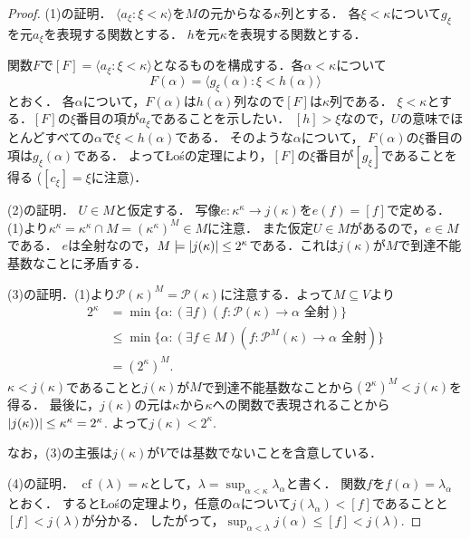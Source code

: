 \documentclass[uplatex]{jsarticle}
\newcommand{\Pow}{\mathcal{P}}
\newcommand{\cf}{\operatorname{cf}}
\newcommand{\seq}[1]{{\langle#1\rangle}}
\DeclarePairedDelimiter\abs{\lvert}{\rvert}
\renewcommand\subset{\subseteq}
\theoremstyle{definition}
\begin{document}
	\begin{proof}
		(1)の証明．
		$\seq{a_\xi : \xi < \kappa}$を$M$の元からなる$\kappa$列とする．
		各$\xi < \kappa$について$g_\xi$を元$a_\xi$を表現する関数とする．
		$h$を元$\kappa$を表現する関数とする．
		
		関数$F$で$[F] = \seq{a_\xi : \xi < \kappa}$となるものを構成する．各$\alpha < \kappa$について
		\[
		F(\alpha) = \seq{g_\xi(\alpha) : \xi < h(\alpha)}
		\]
		とおく．
		各$\alpha$について，$F(\alpha)$は$h(\alpha)$列なので$[F]$は$\kappa$列である．
		$\xi < \kappa$とする．$[F]$の$\xi$番目の項が$a_\xi$であることを示したい．
		$[h] > \xi$なので，$U$の意味でほとんどすべての$\alpha$で$\xi < h(\alpha)$である．
		そのような$\alpha$について， $F(\alpha)$の$\xi$番目の項は$g_\xi(\alpha)$である．
		よってŁośの定理により，$[F]$の$\xi$番目が$[g_\xi]$であることを得る ($[c_\xi] = \xi$に注意)．
		
		(2)の証明．
		$U \in M$と仮定する．
		写像$e \colon \kappa^\kappa \to j(\kappa)$を$e(f) = [f]$で定める．
		(1)より$\kappa^\kappa = \kappa^\kappa \cap M = (\kappa^\kappa)^M \in M$に注意．
		また仮定$U \in M$があるので，$e \in M$である．
		$e$は全射なので，$M \models \abs{j(\kappa)} \le 2^\kappa$である．これは$j(\kappa)$が$M$で到達不能基数なことに矛盾する．
		
		(3)の証明．(1)より$\Pow(\kappa)^M = \Pow(\kappa)$に注意する．よって$M \subset V$より
		\begin{align*}
		2^\kappa &= \min \{ \alpha : (\exists f)(f \colon \Pow(\kappa) \to \alpha \text{ 全射}) \} \\
		&\le \min \{ \alpha : (\exists f \in M)(f \colon \Pow^M(\kappa) \to \alpha \text{ 全射})\} \\
		&= (2^\kappa)^M.
		\end{align*}
		$\kappa < j(\kappa)$であることと$j(\kappa)$が$M$で到達不能基数なことから$(2^\kappa)^M < j(\kappa)$を得る．
		最後に，$j(\kappa)$の元は$\kappa$から$\kappa$への関数で表現されることから$\abs{j(\kappa))} \le \kappa^\kappa = 2^\kappa$.
		よって$j(\kappa) < 2^\kappa$.
		
		なお，(3)の主張は$j(\kappa)$が$V$では基数でないことを含意している．
		
		(4)の証明．
		$\cf(\lambda) = \kappa$として，$\lambda = \sup_{\alpha < \kappa} \lambda_\alpha$と書く．
		関数$f$を$f(\alpha) = \lambda_\alpha$とおく．
		するとŁośの定理より，任意の$\alpha$について$j(\lambda_\alpha) < [f]$であることと$[f] < j(\lambda)$が分かる．
		したがって，$\sup_{\alpha < \lambda} j(\alpha) \le [f] < j(\lambda)$.
		

\end{proof}
\end{document}
